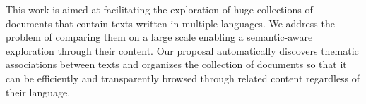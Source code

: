     

This work is aimed at facilitating the exploration of huge collections of documents that contain texts written in multiple languages. We address the problem of comparing them on a large scale enabling a semantic-aware exploration through their content. Our proposal automatically discovers thematic associations between texts and organizes the collection of documents so that it can be efficiently and transparently browsed through related content regardless of their language.







